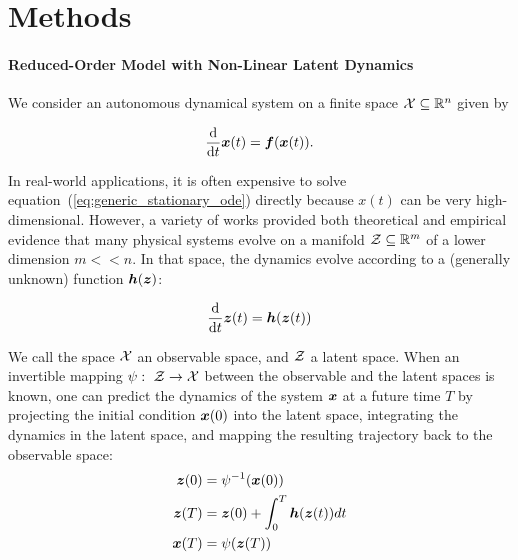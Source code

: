 
\section{Methods}
\label{sec:method}
\paragraph{Reduced-Order Model with Non-Linear Latent Dynamics}
We consider an autonomous dynamical system on a finite space $\operatorname{\mathcal{X}} \subseteq \mathbb{R}^n$ given by

\begin{equation}
    \label{eq:generic_stationary_ode}
        \frac{\mathrm{d}}{\mathrm{d}t}\boldsymbol{x}(t) = \boldsymbol{f}(\boldsymbol{x}(t)).
\end{equation}

In real-world applications, it is often expensive to solve equation~(\ref{eq:generic_stationary_ode}) directly because $x(t)$ can be very high-dimensional. However, a variety of works provided both theoretical \citep{holmes2012turbulence} and empirical \citep{noack2011reduced,chen2021discovering} evidence that many physical systems evolve on a manifold $\operatorname{\mathcal{Z}} \subseteq \mathbb{R}^m$ of a lower dimension $m << n$. In that space, the dynamics evolve according to a (generally unknown) function  $\boldsymbol{h}(\boldsymbol{z})$:

\begin{equation}
    \label{eq:latent_stationary_ode}
        \frac{\mathrm{d}}{\mathrm{d}t}\boldsymbol{z}(t) = \boldsymbol{h}(\boldsymbol{z}(t))
\end{equation}

We call the space $\operatorname{\mathcal{X}}$ an observable space, and $\operatorname{\mathcal{Z}}$ a latent space. When an invertible mapping $\psi:\ \operatorname{\mathcal{Z}} \to \operatorname{\mathcal{X}}$ between the observable and the latent spaces is known, one can predict the dynamics of the system $\boldsymbol{x}$ at a future time $T$ by projecting the initial condition $\boldsymbol{x}(0)$ into the latent space, integrating the dynamics in the latent space, and mapping the resulting trajectory back to the observable space:
\begin{equation}
\label{eq:integration_in_latent_space}
\begin{split}
    \boldsymbol{z}(0) & = \psi^{-1}(\boldsymbol{x}(0)) \\
    \boldsymbol{z}(T) & = \boldsymbol{z}(0) + \int_{0}^T\boldsymbol{h}(\boldsymbol{z}(t))dt \\
    \boldsymbol{x}(T) & = \psi(\boldsymbol{z}(T))
\end{split}
\end{equation}

